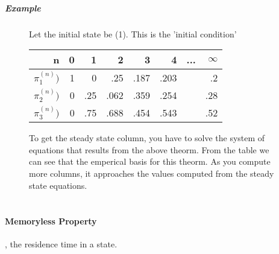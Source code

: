 \subparagraph{Example}
\begin{figure}[!h]
\end{figure}
\begin{figure}[!h]
Let the initial state be (1). This is the 'initial condition'
\begin{tabular}{ r | r  | r  |  r  |  r  |  r  |  r   | r }
	  n & 0 & 1  & 2  & 3  & 4  & ...  & $\infty$ \\
	\hline
	$\pi_1^{(n)})$ & 1 & 0    & .25   & .187  & .203  &  & .2 \\
	$\pi_2^{(n)})$ & 0 & .25  & .062  & .359  & .254  &  & .28 \\
	$\pi_3^{(n)})$ & 0 & .75  & .688  & .454  & .543  &  & .52 \\
\end{tabular}
\end{figure}
\begin{figure}[!h]
To get the steady state column, you have to solve the system of equations that
results from the above theorm. From the table we can see that the emperical
basis for this theorm. As you compute more columns, it approaches the values
computed from the steady state equations.
\end{figure}

\begin{equation*} \begin{split}
\end{split} \end{equation*}

\paragraph{Memoryless Property}, the residence time in a state.













